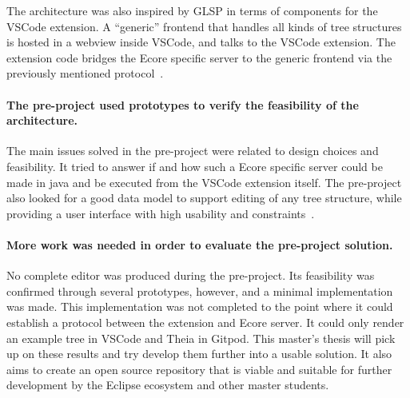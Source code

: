 The architecture was also inspired by \acrshort{GLSP} in terms of components for the \gls{VSCode} extension.
A ``generic'' frontend that handles all kinds of tree structures is hosted in a webview inside \gls{VSCode}, and talks to the \gls{VSCode} extension.
The extension code bridges the \gls{Ecore} specific server to the generic frontend via the previously mentioned protocol~\cite{rekstadModelingEnvironmentCloud2020}.


\paragraph{The pre-project used prototypes to verify the feasibility of the architecture.}
The main issues solved in the pre-project were related to design choices and feasibility.
It tried to answer if and how such a \gls{Ecore} specific server could be made in java and be executed from the \gls{VSCode} extension itself.
The pre-project also looked for a good data model to support editing of any tree structure, while providing a user interface with high usability and constraints~\cite[p.~24,25]{rekstadModelingEnvironmentCloud2020}.

\paragraph{More work was needed in order to evaluate the pre-project solution.}
No complete editor was produced during the pre-project.
Its feasibility was confirmed through several prototypes, however, and a minimal implementation was made.
This implementation was not completed to the point where it could establish a protocol between the extension and \gls{Ecore} server.
It could only render an example tree in \gls{VSCode} and \gls{Theia} in \gls{Gitpod}.
This master's thesis will pick up on these results and try develop them further into a usable solution.
It also aims to create an \gls{open source} repository that is viable and suitable for further development by the Eclipse ecosystem and other master students.


